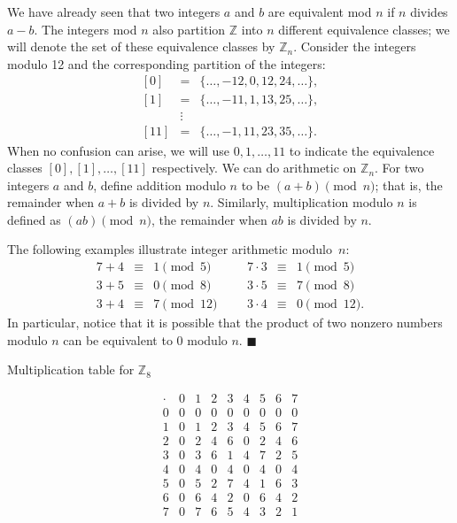 We have already seen that two integers $a$ and $b$ are equivalent mod $n$ if $n$ divides $a - b$.  The integers mod $n$ also partition ${\mathbb Z}$ into $n$ different equivalence classes; we will denote the set of these equivalence classes by ${\mathbb Z}_n$\label{integersmodn}.  Consider the integers modulo 12 and the corresponding partition of the integers:  
\begin{eqnarray*}
{[0]} & = & \{ \ldots, -12, 0, 12, 24, \ldots \}, \\
{[1]} & = & \{ \ldots, -11, 1, 13, 25, \ldots \}, \\
      & \vdots & \\
{[11]} & = & \{ \ldots, -1, 11, 23, 35, \ldots \}.
\end{eqnarray*}
When no confusion can arise, we will use $0, 1, \ldots, 11$ to indicate the equivalence classes  ${[0]}, {[1]}, \ldots, {[11]}$ respectively.  We can do arithmetic on ${\mathbb Z}_n$.  For two integers $a$ and $b$, define addition modulo $n$ to be $(a + b) \pmod{n}$; that is, the remainder when $a + b$ is divided by $n$.  Similarly, multiplication modulo $n$ is defined as $(a  b) \pmod{ n}$, the remainder when $a  b$ is divided by $n$.

\medskip

The following examples illustrate integer arithmetic modulo~$n$:
$$
\begin{array}{rclccrcl}
7 + 4     & \equiv & 1 \pmod{ 5} & & &
7 \cdot 3 & \equiv & 1 \pmod{ 5} \\
3 + 5     & \equiv & 0 \pmod{ 8} & & &
3 \cdot 5 & \equiv & 7 \pmod{ 8} \\
3 + 4     & \equiv & 7 \pmod{ 12} & & &
3 \cdot 4 & \equiv & 0 \pmod{ 12}.
\end{array}
$$
In particular, notice that it is possible that the product of two nonzero numbers modulo $n$ can be equivalent to $0 $ modulo $n$. 
\mbox{\hspace{1in}}
\hspace{\fill} $\blacksquare$

\begin{table}[hb]\label{groups_table_1}
\caption{Multiplication table for ${\mathbb Z}_8$}{\small
$$
\begin{array}{c|cccccccc}
\cdot & 0 & 1 & 2 & 3 & 4 & 5 & 6 & 7 \\
\hline
0     & 0 & 0 & 0 & 0 & 0 & 0 & 0 & 0 \\
1     & 0 & 1 & 2 & 3 & 4 & 5 & 6 & 7 \\
2     & 0 & 2 & 4 & 6 & 0 & 2 & 4 & 6 \\
3     & 0 & 3 & 6 & 1 & 4 & 7 & 2 & 5 \\
4     & 0 & 4 & 0 & 4 & 0 & 4 & 0 & 4 \\
5     & 0 & 5 & 2 & 7 & 4 & 1 & 6 & 3 \\
6     & 0 & 6 & 4 & 2 & 0 & 6 & 4 & 2 \\
7     & 0 & 7 & 6 & 5 & 4 & 3 & 2 & 1
\end{array}
$$
}
\end{table}

